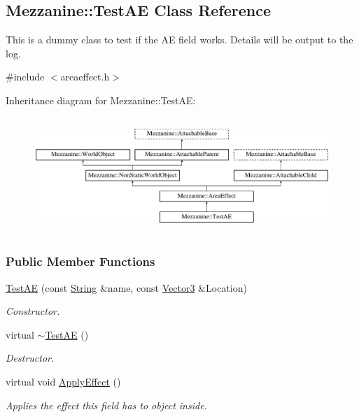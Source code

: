 \hypertarget{classMezzanine_1_1TestAE}{
\subsection{Mezzanine::TestAE Class Reference}
\label{classMezzanine_1_1TestAE}
}


This is a dummy class to test if the AE field works. Details will be output to the log.  




{\ttfamily \#include $<$areaeffect.h$>$}

Inheritance diagram for Mezzanine::TestAE:\begin{figure}[H]
\begin{center}
\leavevmode
\includegraphics[height=4.423381cm]{classMezzanine_1_1TestAE}
\end{center}
\end{figure}
\subsubsection*{Public Member Functions}
\begin{DoxyCompactItemize}
\item 
\hyperlink{classMezzanine_1_1TestAE_a19ed2bafef2c0d835bbf01efdda3e241}{TestAE} (const \hyperlink{namespaceMezzanine_acf9fcc130e6ebf08e3d8491aebcf1c86}{String} \&name, const \hyperlink{classMezzanine_1_1Vector3}{Vector3} \&Location)
\begin{DoxyCompactList}\small\item\em Constructor. \item\end{DoxyCompactList}\item 
virtual \hyperlink{classMezzanine_1_1TestAE_adb985f43d40500de7f18041a4f7807d7}{$\sim$TestAE} ()
\begin{DoxyCompactList}\small\item\em Destructor. \item\end{DoxyCompactList}\item 
virtual void \hyperlink{classMezzanine_1_1TestAE_a647737a517fb6c87489afc93b9daa91c}{ApplyEffect} ()
\begin{DoxyCompactList}\small\item\em Applies the effect this field has to object inside. \item\end{DoxyCompactList}\end{DoxyCompactItemize}



